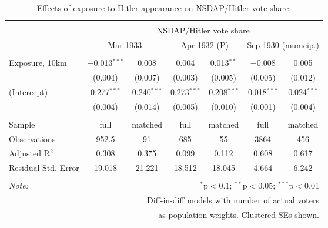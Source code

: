 
\begin{table}[!htbp] \centering 
  \caption{Effects of exposure to Hitler appearance on NSDAP/Hitler vote share.} 
  \label{tab:nsdap-voteshare-dd-2} 
\begin{tabular}{@{\extracolsep{5pt}}lcccccc} 
\\[-1.8ex]\hline 
\hline \\[-1.8ex] 
 & \multicolumn{6}{c}{NSDAP/Hitler vote share} \\ 
\cline{2-7} 
 & \multicolumn{2}{c}{Mar 1933} & \multicolumn{2}{c}{Apr 1932 (P)} & \multicolumn{2}{c}{Sep 1930 (municip.)} \\ 
\hline \\[-1.8ex] 
 Exposure, 10km & $-$0.013$^{***}$ & 0.008 & 0.004 & 0.013$^{**}$ & $-$0.008 & 0.005 \\ 
  & (0.004) & (0.007) & (0.003) & (0.005) & (0.005) & (0.012) \\ 
  (Intercept) & 0.277$^{***}$ & 0.240$^{***}$ & 0.273$^{***}$ & 0.208$^{***}$ & 0.018$^{***}$ & 0.024$^{***}$ \\ 
  & (0.004) & (0.014) & (0.005) & (0.010) & (0.001) & (0.004) \\ 
 \hline \\[-1.8ex] 
Sample & full & matched & full & matched & full & matched \\ 
Observations & 952.5 & 91 & 685 & 55 & 3864 & 456 \\ 
Adjusted R$^{2}$ & 0.308 & 0.375 & 0.099 & 0.112 & 0.608 & 0.617 \\ 
Residual Std. Error & 19.018 & 21.221 & 18.512 & 18.045 & 4.664 & 6.242 \\ 
\hline 
\hline \\[-1.8ex] 
\textit{Note:}  & \multicolumn{6}{r}{$^{*}$p$<$0.1; $^{**}$p$<$0.05; $^{***}$p$<$0.01} \\ 
 & \multicolumn{6}{r}{Diff-in-diff models with number of actual voters} \\ 
 & \multicolumn{6}{r}{as population weights. Clustered SEs shown.} \\ 
\end{tabular} 
\end{table} 
